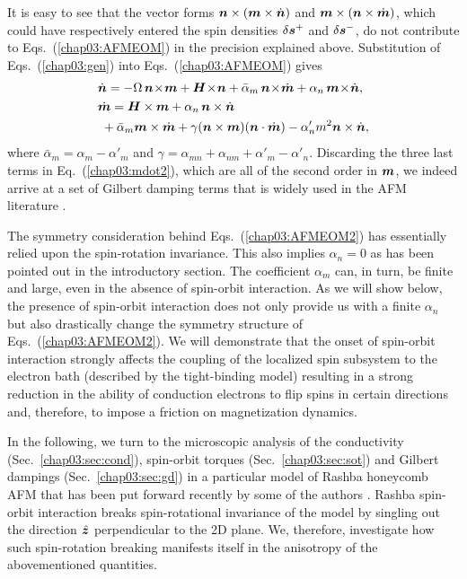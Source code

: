 It is easy to see that the vector forms $\boldsymbol{n}\times(\boldsymbol{m}\times\dot{\boldsymbol{n}})$ and $\boldsymbol{m}\times(\boldsymbol{n}\times \dot{\boldsymbol{m}})$, which could have respectively entered the spin densities $\delta\boldsymbol{s}^+$ and $\delta\boldsymbol{s}^-$, do not contribute to Eqs.~(\ref{chap03:AFMEOM}) in the precision explained above.  
Substitution of Eqs.~(\ref{chap03:gen}) into Eqs.~(\ref{chap03:AFMEOM}) gives 
\beml
\label{chap03:AFMEOM2}
\begin{align}
\label{chap03:ndot2}
&\dot{\bb{n}} = -\Omega\, \bb{n}\!\times\!\bb{m} +\bb{H}\!\times\!\bb{n}+\bar{\alpha}_m\,\bb{n}\!\times\!\dot{\bb{m}}+\alpha_n\,\bb{m}\!\times\! \dot{\bb{n}},\\
\label{chap03:mdot2}
&\dot{\bb{m}} =\bb{H}\times\bb{m}+\alpha_n\,\bb{n} \times \dot{\bb{n}}\n\\
&\;+\bar{\alpha}_m \bb{m} \times \dot{\bb{m}} +\gamma (\bb{n}\times\bb{m})(\bb{n}\cdot\dot{\bb{m}}) - \alpha_n'm^2\bb{n}\times\dot{\bb{n}} ,
\end{align}
\eml
where $\bar{\alpha}_m=\alpha_m\!-\!\alpha'_m$ and $\gamma=\alpha_{mn}\!+\!\alpha_{nm}\!+\!\alpha'_m\!-\!\alpha'_n$. Discarding the three last terms in Eq.~(\ref{chap03:mdot2}), which are all of the second order in $\boldsymbol{m}$, we indeed arrive at a set of Gilbert damping terms that is  widely used in the AFM literature \cite{Kamra2018,PhysRevMaterials.1.061401,Yuan_2019}. 

The symmetry consideration behind Eqs.~(\ref{chap03:AFMEOM2}) has essentially relied upon the spin-rotation invariance. This also implies $\alpha_n=0$ as has been pointed out in the introductory section. The coefficient $\alpha_m$ can, in turn, be finite and large, even in the absence of spin-orbit interaction. As we will show below, the presence of spin-orbit interaction does not only provide us with a finite $\alpha_n$ but also drastically change the symmetry structure of Eqs.~(\ref{chap03:AFMEOM2}). We will demonstrate that the onset of spin-orbit interaction strongly affects the coupling of the localized spin subsystem to the electron bath (described by the tight-binding model) resulting in a strong reduction in the ability of conduction electrons to flip spins in certain directions and, therefore, to impose a friction on magnetization dynamics. 

In the following, we turn to the microscopic analysis of the conductivity (Sec.~\ref{chap03:sec:cond}), spin-orbit torques (Sec.~\ref{chap03:sec:sot}) and Gilbert dampings (Sec.~\ref{chap03:sec:gd}) in a particular model of Rashba honeycomb AFM that has been put forward recently by some of the authors \cite{Sumit2019-}. Rashba spin-orbit interaction breaks spin-rotational invariance of the model by singling out the direction $\hat{\boldsymbol{z}}$ perpendicular to the 2D plane. We, therefore, investigate how such spin-rotation breaking manifests itself in the anisotropy of the abovementioned quantities.  

